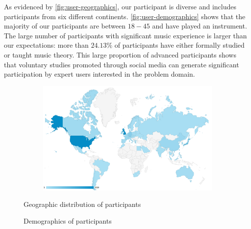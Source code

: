 As evidenced by \vref{fig:user-geographics}, our participant is diverse and
includes participants from six different continents.
\vref{fig:user-demographics} shows that the majority of our participants are
between $18-45$ and have played an instrument. The large number of participants
with significant music experience is larger than our expectations: more than
$24.13\%$ of participants have either formally studied or taught music theory.
This large proportion of advanced participants shows that voluntary studies
promoted through social media can generate significant participation by expert
users interested in the problem domain.

\begin{figure}[p]
  \centering
  \begin{subfigure}[b]{0.98\textwidth}
    \centering
    \includegraphics[width=1.0\linewidth]{participants-by-country.png}
  \end{subfigure}
  \begin{subfigure}[c]{0.55\textwidth}
    \centering
    
  \end{subfigure}
  \begin{subfigure}[c]{0.44\textwidth}
    \centering
    
  \end{subfigure}
  \caption{Geographic distribution of participants}
  \label{fig:user-geographics}
\end{figure}

\begin{figure}[tb]
  \centering
  
  \caption{Demographics of participants}
  \label{fig:user-demographics}
\end{figure}

